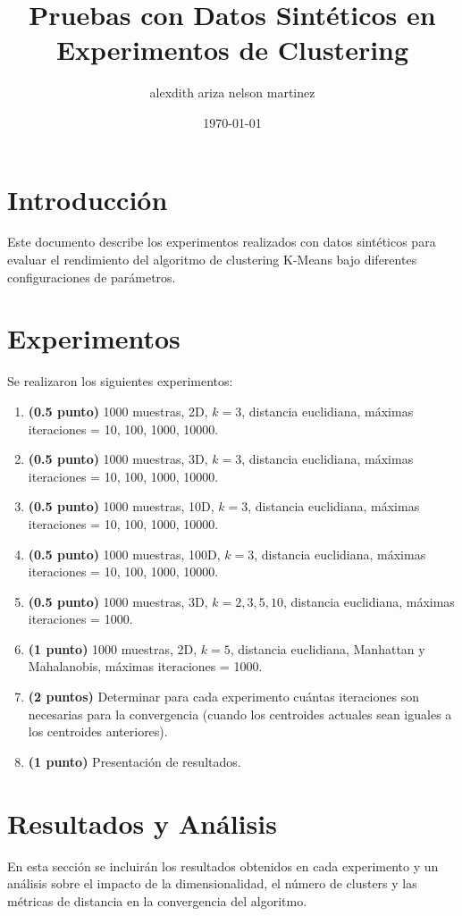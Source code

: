 \documentclass[a4paper, 10pt]{article}
\begin{document}
\title{Pruebas con Datos Sintéticos en Experimentos de Clustering}
\author{alexdith ariza
nelson martinez}
\date{\today}
\maketitle

\section{Introducción}
Este documento describe los experimentos realizados con datos sintéticos para evaluar el rendimiento del algoritmo de clustering K-Means bajo diferentes configuraciones de parámetros.

\section{Experimentos}
Se realizaron los siguientes experimentos:

\begin{enumerate}
    \item \textbf{(0.5 punto)} 1000 muestras, 2D, $k=3$, distancia euclidiana, máximas iteraciones = 10, 100, 1000, 10000.
    \item \textbf{(0.5 punto)} 1000 muestras, 3D, $k=3$, distancia euclidiana, máximas iteraciones = 10, 100, 1000, 10000.
    \item \textbf{(0.5 punto)} 1000 muestras, 10D, $k=3$, distancia euclidiana, máximas iteraciones = 10, 100, 1000, 10000.
    \item \textbf{(0.5 punto)} 1000 muestras, 100D, $k=3$, distancia euclidiana, máximas iteraciones = 10, 100, 1000, 10000.
    \item \textbf{(0.5 punto)} 1000 muestras, 3D, $k=2,3,5,10$, distancia euclidiana, máximas iteraciones = 1000.
    \item \textbf{(1 punto)} 1000 muestras, 2D, $k=5$, distancia euclidiana, Manhattan y Mahalanobis, máximas iteraciones = 1000.
    \item \textbf{(2 puntos)} Determinar para cada experimento cuántas iteraciones son necesarias para la convergencia (cuando los centroides actuales sean iguales a los centroides anteriores).
    \item \textbf{(1 punto)} Presentación de resultados.
\end{enumerate}

\section{Resultados y Análisis}
En esta sección se incluirán los resultados obtenidos en cada experimento y un análisis sobre el impacto de la dimensionalidad, el número de clusters y las métricas de distancia en la convergencia del algoritmo.
\end{document}

